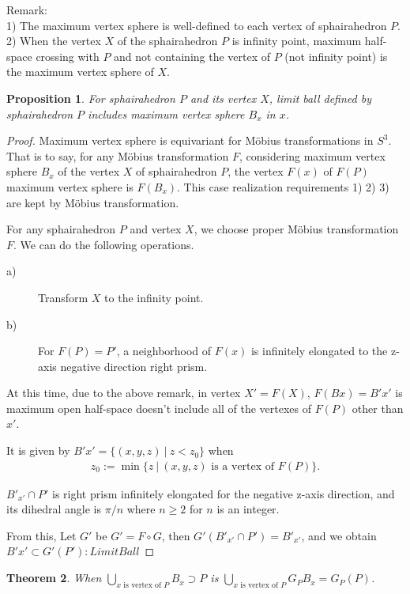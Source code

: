 \documentclass[suppldata, dvipdfmx]{interact}
\theoremstyle{plain}%
\newtheorem{theorem}{Theorem}[section]
\newtheorem{proposition}[theorem]{Proposition}
\theoremstyle{definition}
\theoremstyle{remark}
\theoremstyle{problemstyle}
\begin{document}
Remark: \\
1) The maximum vertex sphere is well-defined to each vertex of sphairahedron
$P$.\\
2) When the vertex $X$ of the sphairahedron $P$ is infinity point,
 maximum half-space crossing with $P$ and not containing the vertex of
 $P$ (not infinity point)
 is the maximum vertex sphere of $X$.

\begin{proposition}\label{prop:limitBall}
 For sphairahedron $P$ and its vertex $X$, limit ball defined by
 sphairahedron $P$ includes maximum vertex sphere $B_x$ in $x$.
\end{proposition}

\begin{proof}
 Maximum vertex sphere is equivariant for M\"obius transformations in
 $S^3$. That is to say, for any M\"obius transformation $F$,
 considering maximum vertex sphere $B_x$ of the vertex $X$ of
 sphairahedron $P$,
 the vertex $F(x)$ of $F(P)$ maximum vertex sphere is $F(B_x)$.
 This case realization requirements 1) 2) 3) are kept by M\"obius
 transformation. 

 For any sphairahedron $P$ and vertex $X$, we choose proper M\"obius
 transformation $F$. We can do the following operations.
 \begin{description}
  \item[a)] Transform $X$ to the infinity point.
  \item[b)] For $F(P)=P'$, a neighborhood of $F(x)$ is infinitely elongated
             to the z-axis negative direction right prism.
 \end{description}
 At this time, due to the above remark, in vertex $X' = F(X)$,
 $F(Bx) = B'x'$ is maximum open half-space doesn't include all of the
 vertexes of $F(P)$ other than $x'$.
 
 It is given by $B'x' = \{(x, y, z)~|~z < z_0\}$ when
\begin{align*}
z_0 := \min\{ z~|~(x, y, z) \text{ is a vertex of } F(P) \}.
\end{align*}

 $B'_{x'} \cap P'$ is right prism infinitely elongated for the negative
 z-axis direction, and its dihedral angle is $\pi/n$ where $n \geq 2$
 for $n$ is an integer.

 From this, Let $G'$ be $G'=F \circ G$, then
 $G'(B'_{x'} \cap P') = B'_{x'}$, and
 we obtain $B'x' \subset G'(P') : Limit Ball$
\end{proof}

\begin{theorem}
 When $\displaystyle\bigcup_{x \text{ is vertex of } P} B_x \supset P$ is
 $\displaystyle\bigcup_{x \text{ is vertex of } P} G_P{B_x} = G_{P}(P)$.
\end{theorem}
\end{document}
